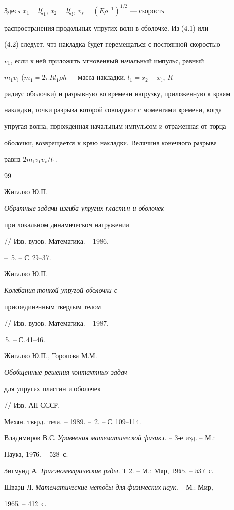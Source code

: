 Здесь $x_1=l\xi_1$, $x_2=l\xi_2$, $v_{s}=(E\rho^{-1})^{1/2}$ --- скорость


распространения продольных упругих волн в оболочке. Из (4.1) или


(4.2) следует, что накладка будет перемещаться с постоянной скоростью


$v_{1}$, если к ней приложить мгновенный начальный импульс, равный


$m_1v_1$ ($m_1=2\pi Rl_1\rho h$ --- масса накладки, $l_1=x_2-x_1$, $R$ ---


радиус оболочки) и разрывную во времени нагрузку, приложенную к краям


накладки, точки разрыва которой совпадают с моментами времени, когда


упругая волна, порожденная начальным импульсом и отраженная от торца


оболочки, возвращается к краю накладки. Величина конечного разрыва


равна $2m_1 v_1 v_s /l_1$.





\begin{thebibliography}{99}







Жигалко Ю.П. {\em Обратные задачи изгиба упругих пластин и оболочек


при локальном динамическом нагружении} // Изв. вузов. Математика. -- 1986.


-- \No\,5. -- С.\,29--37.




Жигалко Ю.П. {\em Колебания тонкой упругой оболочки с


присоединенным твердым телом} // Изв. вузов. Математика. -- 1987. --


\No\,5. -- С.\,41--46.




Жигалко Ю.П., Торопова М.М. {\em Обобщенные решения контактных задач


для упругих пластин и оболочек} // Изв. АН СССР.


Механ. тверд. тела. -- 1989. -- \No\,2. -- С.\,109--114.




Владимиров В.С. {\em Уравнения математической физики}. -- 3-е изд. -- М.:


Наука, 1976. -- 528~с.




Зигмунд А. {\em Тригонометрические ряды}. Т 2. -- М.: Мир, 1965. -- 537~с.




Шварц Л. {\em Математические методы для физических наук}. -- М.: Мир,


1965. -- 412~с.





\end{thebibliography}





